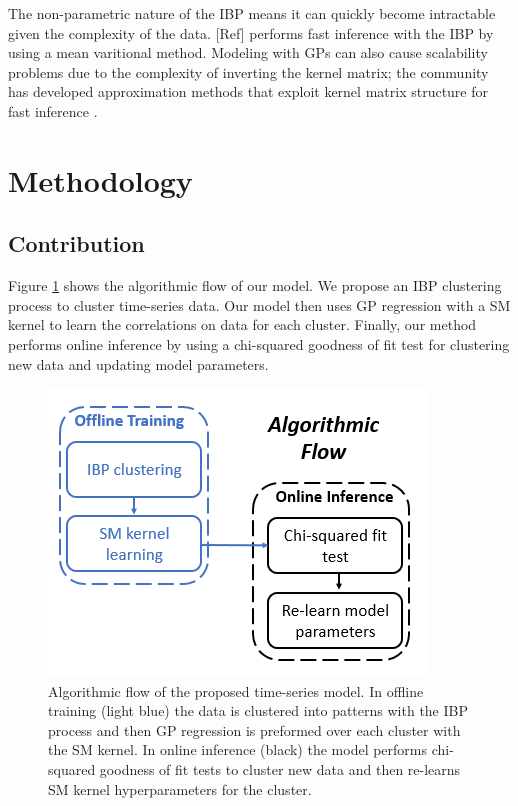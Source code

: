 \documentclass{article}
\begin{document}
The non-parametric nature of the IBP means it can quickly become intractable given the complexity of the data. [Ref] performs fast inference with the IBP by using a mean varitional method. Modeling with GPs can also cause scalability problems due to the complexity of inverting the kernel matrix; the community has developed approximation methods that exploit kernel matrix structure for fast inference \cite{KISS-GP}.

\section{Methodology}

\subsection{Contribution}
Figure \ref{AlgFlow} shows the algorithmic flow of our model. We propose an IBP clustering process to cluster time-series data. Our model then uses GP regression with a SM kernel to learn the correlations on data for each cluster. Finally, our method performs online inference by using a chi-squared goodness of fit test for clustering new data and updating model parameters.

\begin{figure}[ht]
\vskip 0.2in
\begin{center}
\centerline{\includegraphics[width=\columnwidth]{AlgFlow}}
\caption{Algorithmic flow of the proposed time-series model. In offline training (light blue) the data is clustered into patterns with the IBP process and then GP regression is preformed over each cluster with the SM kernel. In online inference (black) the model performs chi-squared goodness of fit tests to cluster new data and then re-learns SM kernel hyperparameters for the cluster.}
\label{AlgFlow}
\end{center}
\vskip -0.2in
\end{figure} 
\end{document}
